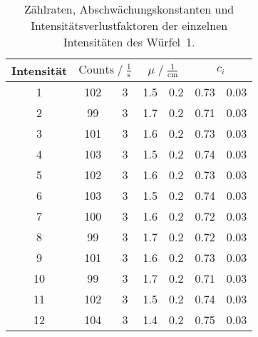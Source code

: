 \begin{table}
  \centering
  \caption{Zählraten, Abschwächungskonstanten und Intensitätsverlustfaktoren der einzelnen Intensitäten des Würfel~1.}
  \label{tab:wuerfel-1}
  \begin{tabular}{S[table-format=2.0] S[table-format=3.0]@{${}\pm{}$}S[table-format=1.0]
      S[table-format=1.2]@{${}\pm{}$}S[table-format=1.2] S[table-format=1.2]@{${}\pm{}$}S[table-format=1.2]}
    \toprule
    {Intensität} & 
      &  &  \\
     & 102 & 3 & 1.5 & 0.2 & 0.73 & 0.03 \\
     2 &  99 & 3 & 1.7 & 0.2 & 0.71 & 0.03 \\
     3 & 101 & 3 & 1.6 & 0.2 & 0.73 & 0.03 \\
     4 & 103 & 3 & 1.5 & 0.2 & 0.74 & 0.03 \\
     5 & 102 & 3 & 1.6 & 0.2 & 0.73 & 0.03 \\
     6 & 103 & 3 & 1.5 & 0.2 & 0.74 & 0.03 \\
     7 & 100 & 3 & 1.6 & 0.2 & 0.72 & 0.03 \\
     8 &  99 & 3 & 1.7 & 0.2 & 0.72 & 0.03 \\
     9 & 101 & 3 & 1.6 & 0.2 & 0.73 & 0.03 \\
    10 &  99 & 3 & 1.7 & 0.2 & 0.71 & 0.03 \\
    11 & 102 & 3 & 1.5 & 0.2 & 0.74 & 0.03 \\
    12 & 104 & 3 & 1.4 & 0.2 & 0.75 & 0.03 \\
    \bottomrule
  \end{tabular}
\end{table}
\FloatBarrier
